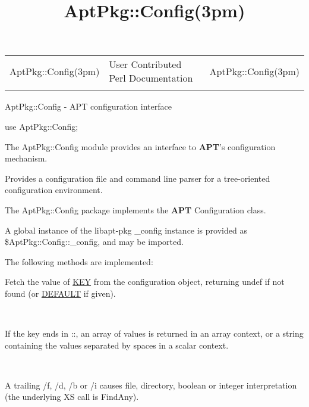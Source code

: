 \documentclass[]{article}
\title{AptPkg::Config(3pm)}
\author{}
\date{}
\let\realtextbf=\textbf
\renewcommand{\textbf}[1]{\textcolor{boldcolor}{\realtextbf{#1}}}
\renewcommand{\emph}[1]{\underline{#1}}
\begin{document}
\maketitle

\begin{longtable}[c]{@{}lll@{}}
\toprule\addlinespace
AptPkg::Config(3pm) & User Contributed Perl Documentation &
AptPkg::Config(3pm)
\\\addlinespace
\bottomrule
\end{longtable}


AptPkg::Config - APT configuration interface


use AptPkg::Config;


The AptPkg::Config module provides an interface to \textbf{APT}'s
configuration mechanism.

Provides a configuration file and command line parser for a
tree-oriented configuration environment.


The AptPkg::Config package implements the \textbf{APT} Configuration
class.

A global instance of the libapt-pkg \_config instance is provided as
\$AptPkg::Config::\_config, and may be imported.

The following methods are implemented:

\begin{description}
\itemsep1pt\parskip0pt
\item[get(\emph{KEY}, {[}\emph{DEFAULT}{]})]
Fetch the value of \emph{KEY} from the configuration object, returning
undef if not found (or \emph{DEFAULT} if given).

~

If the key ends in ::, an array of values is returned in an array
context, or a string containing the values separated by spaces in a
scalar context.

~

A trailing /f, /d, /b or /i causes file, directory, boolean or integer
interpretation (the underlying XS call is FindAny).
\end{description}
\end{document}
